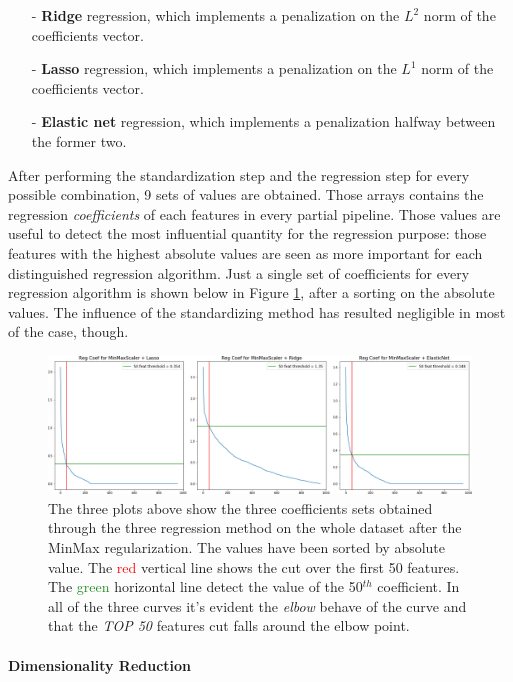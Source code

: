 \documentclass{article}
\begin{document}
\begin{itemize}
\item [-]\textbf{Ridge} regression, which implements a penalization on the $L^2$ norm of the coefficients vector.
\item [-]\textbf{Lasso} regression, which implements a penalization on the $L^1$ norm of the coefficients vector.
\item [-]\textbf{Elastic net} regression, which implements a penalization halfway between the former two.
\end{itemize}

After performing the standardization step and the regression step for every possible combination, 9 sets of values are obtained. Those arrays contains the regression \emph{coefficients} of each features in every partial pipeline. Those values are useful to detect the most influential quantity for the regression purpose: those features with the highest absolute values are seen as more important for each distinguished regression algorithm. Just a single set of coefficients for every regression algorithm is shown below in Figure \ref{fig:3_coef}, after a sorting on the absolute values. The influence of the standardizing method has resulted negligible in most of the case, though.

\begin{figure}[ht]
	\includegraphics[width=\textwidth]{one_set_coefs.png}
	\caption{The three plots above show the three coefficients sets obtained through the three regression method on the whole dataset after the MinMax regularization. The values have been sorted by absolute value. The \textcolor{red}{red} vertical line shows the cut over the first 50 features. The \textcolor{ForestGreen}{green}  horizontal line detect the value of the 50$^{th}$ coefficient. In all of the three curves it's evident the \emph{elbow} behave of the curve and that the \emph{TOP 50} features cut falls around the elbow point.}
	\label{fig:3_coef}
	\centering
\end{figure}

\paragraph{Dimensionality Reduction}
\end{document}
